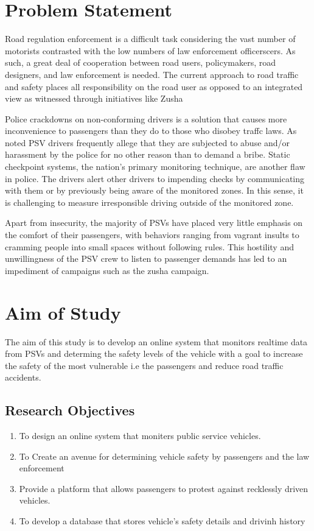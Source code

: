 \documentclass[a4paper, 12pt]{report}
\begin{document}
\section{Problem Statement}
\noindent Road regulation enforcement is a difficult task considering the vast number of
motorists contrasted with the low numbers of law enforcement officerscers. As such,
a great deal of cooperation between road users, policymakers, road designers, and
law enforcement is needed. The current approach to road traffic and safety places
all responsibility on the road user as opposed to an integrated view as witnessed
through initiatives like Zusha\par
\noindent Police crackdowns on non-conforming drivers is a solution that causes more inconvenience to passengers than they do to those who disobey traffc laws. As noted
PSV drivers frequently allege that they are subjected to abuse and/or harassment
by the police for no other reason than to demand a bribe. Static checkpoint systems, the nation's primary monitoring technique, are another flaw in police. The
drivers alert other drivers to impending checks by communicating with them or by previously being aware of the monitored zones. In this sense, it is challenging
to measure irresponsible driving outside of the monitored zone.\par 
\noindent Apart from insecurity, the majority of PSVs have placed very little emphasis on
the comfort of their passengers, with behaviors ranging from vagrant insults to
cramming people into small spaces without following rules. This hostility and
unwillingness of the PSV crew to listen to passenger demands has led to an impediment of campaigns such as the zusha campaign.

\section{Aim of Study}
\noindent The aim of this study is to develop an online system that monitors realtime data
from PSVs and determing the safety levels of the vehicle with a goal to increase the
safety of the most vulnerable i.e the passengers and reduce road traffic accidents.

\subsection{Research Objectives}
\noindent
\begin{enumerate}
\item To design an online system that moniters public service vehicles.
\item To Create an avenue for determining vehicle safety by passengers and the
law enforcement
\item Provide a platform that allows passengers to protest against recklessly driven
vehicles.
\item To develop a database that stores vehicle's safety details and drivinh history
\end{enumerate}
\end{document}
